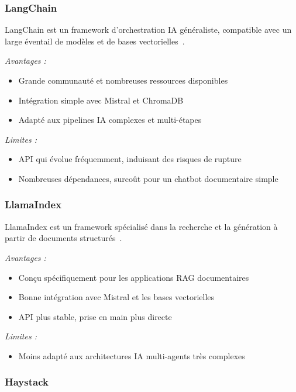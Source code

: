 \subsubsection{LangChain}

LangChain est un framework d'orchestration IA généraliste, compatible
avec un large éventail de modèles et de bases vectorielles~\cite{langchain_dev}.

\textit{Avantages :}
\begin{itemize}
  \item Grande communauté et nombreuses ressources disponibles
  \item Intégration simple avec Mistral et ChromaDB
  \item Adapté aux pipelines IA complexes et multi-étapes
\end{itemize}

\textit{Limites :}
\begin{itemize}
  \item API qui évolue fréquemment, induisant des risques de rupture
  \item Nombreuses dépendances, surcoût pour un chatbot documentaire simple
\end{itemize}

\subsubsection{LlamaIndex}

LlamaIndex est un framework spécialisé dans la recherche et la génération
à partir de documents structurés~\cite{LlamaIndex_dev}.

\textit{Avantages :}
\begin{itemize}
  \item Conçu spécifiquement pour les applications RAG documentaires
  \item Bonne intégration avec Mistral et les bases vectorielles
  \item API plus stable, prise en main plus directe
\end{itemize}

\textit{Limites :}
\begin{itemize}
  \item Moins adapté aux architectures IA multi-agents très complexes
\end{itemize}

\subsubsection{Haystack}

